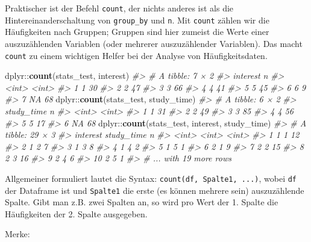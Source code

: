\documentclass[12pt,ngerman,]{book}
\newenvironment{Shaded}{\begin{snugshade}}{\end{snugshade}}
\newcommand{\KeywordTok}[1]{\textcolor[rgb]{0.13,0.29,0.53}{\textbf{{#1}}}}
\newcommand{\CommentTok}[1]{\textcolor[rgb]{0.56,0.35,0.01}{\textit{{#1}}}}
\newcommand{\NormalTok}[1]{{#1}}
\renewenvironment{Shaded}{\begin{kframe}}{\end{kframe}}
\begin{document}
Praktischer ist der Befehl \texttt{count}, der
nichts anderes ist als die Hintereinanderschaltung von
\texttt{group\_by} und \texttt{n}. Mit \texttt{count} zählen wir die
Häufigkeiten nach Gruppen; Gruppen sind hier zumeist die Werte einer
auszuzählenden Variablen (oder mehrerer auszuzählender Variablen). Das
macht \texttt{count} zu einem wichtigen Helfer bei der Analyse von
Häufigkeitsdaten.

\begin{Shaded}
\begin{Highlighting}[]
\NormalTok{dplyr::}\KeywordTok{count}\NormalTok{(stats_test, interest)}
\CommentTok{#> # A tibble: 7 × 2}
\CommentTok{#>   interest     n}
\CommentTok{#>      <int> <int>}
\CommentTok{#> 1        1    30}
\CommentTok{#> 2        2    47}
\CommentTok{#> 3        3    66}
\CommentTok{#> 4        4    41}
\CommentTok{#> 5        5    45}
\CommentTok{#> 6        6     9}
\CommentTok{#> 7       NA    68}
\NormalTok{dplyr::}\KeywordTok{count}\NormalTok{(stats_test, study_time)}
\CommentTok{#> # A tibble: 6 × 2}
\CommentTok{#>   study_time     n}
\CommentTok{#>        <int> <int>}
\CommentTok{#> 1          1    31}
\CommentTok{#> 2          2    49}
\CommentTok{#> 3          3    85}
\CommentTok{#> 4          4    56}
\CommentTok{#> 5          5    17}
\CommentTok{#> 6         NA    68}
\NormalTok{dplyr::}\KeywordTok{count}\NormalTok{(stats_test, interest, study_time)}
\CommentTok{#> # A tibble: 29 × 3}
\CommentTok{#>    interest study_time     n}
\CommentTok{#>       <int>      <int> <int>}
\CommentTok{#> 1         1          1    12}
\CommentTok{#> 2         1          2     7}
\CommentTok{#> 3         1          3     8}
\CommentTok{#> 4         1          4     2}
\CommentTok{#> 5         1          5     1}
\CommentTok{#> 6         2          1     9}
\CommentTok{#> 7         2          2    15}
\CommentTok{#> 8         2          3    16}
\CommentTok{#> 9         2          4     6}
\CommentTok{#> 10        2          5     1}
\CommentTok{#> # ... with 19 more rows}
\end{Highlighting}
\end{Shaded}

Allgemeiner formuliert lautet die Syntax:
\texttt{count(df,\ Spalte1,\ ...)}, wobei \texttt{df} der Dataframe ist
und \texttt{Spalte1} die erste (es können mehrere sein) auszuzählende
Spalte. Gibt man z.B. zwei Spalten an, so wird pro Wert der 1. Spalte
die Häufigkeiten der 2. Spalte ausgegeben.

Merke:
\end{document}
